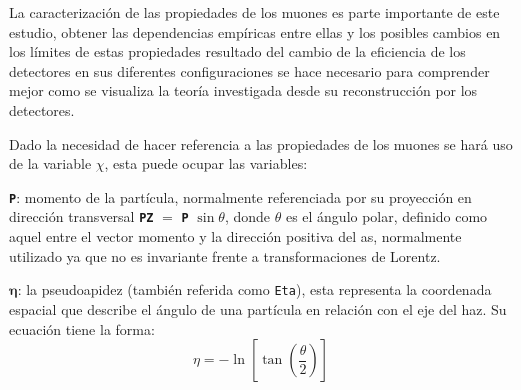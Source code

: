La caracterización de las propiedades de los muones es parte importante de este estudio, obtener las dependencias empíricas entre ellas y los posibles cambios en los límites de estas propiedades resultado del cambio de la eficiencia de los detectores en sus diferentes configuraciones se hace necesario para comprender mejor como se visualiza la teoría investigada desde su reconstrucción por los detectores.

Dado la necesidad de hacer referencia a las propiedades de los muones se hará uso de la variable $\chi$, esta puede ocupar las variables: 

\begin{itemize_f}
\item \texttt{\textbf{P}}: momento de la partícula, normalmente referenciada por su proyección en dirección transversal \texttt{\textbf{PZ}} $=$ \texttt{\textbf{P}} $\sin \theta$, donde $\theta$ es el ángulo polar, definido como aquel entre el vector momento y la dirección positiva del as, normalmente utilizado ya que no es invariante frente a transformaciones de Lorentz.\\
\item $\mathbf{\eta}$: la pseudoapidez (también referida como \texttt{Eta}), esta representa la coordenada espacial que describe el ángulo de una partícula en relación con el eje del haz. Su ecuación tiene la forma:
\begin{equation}
\eta = -\ln \left[ \tan \left( \dfrac{\theta}{2} \right)\right]
\end{equation}


\end{itemize_f}
